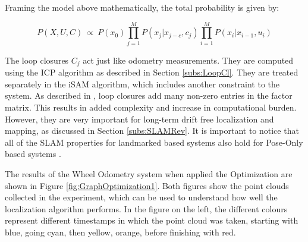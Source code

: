 \documentclass[11pt]{article}
\begin{document}
Framing the model above mathematically, the total probability is given by:

\begin{equation}
P(X,U,C)\ \propto \ P(x_0)\prod_{j=1}^{M}P(x_j|x_{j-c},c_j)\prod_{i=1}^{M}P(x_i|x_{i-1}, u_i)
\label{eq:probSLAM2}
\end{equation}
	
The loop closures $C_j$ act just like odometry measurements. They are computed using the ICP algorithm as described in Section \ref{subs:LoopCl}. They are treated separately in the iSAM algorithm, which includes another constraint to the system. As described in \cite{Kaess08tro}, loop closures add many non-zero entries in the factor matrix. This results in added complexity and increase in computational burden. However, they are very important for long-term drift free localization and mapping, as discussed in Section \ref{subs:SLAMRev}. It is important to notice that all of the SLAM properties for landmarked based systems also hold for Pose-Only based systems \cite{Kaess08tro}.
	
The results of the Wheel Odometry system when applied the Optimization are shown in Figure \ref{fig:GraphOptimization1}. Both figures show the  point clouds collected in the experiment, which can be used to understand how well the localization algorithm performs. In the figure on the left, the different colours represent different timestamps in which the point cloud was taken, starting with blue, going cyan, then yellow, orange, before finishing with red.
	
\end{document}
